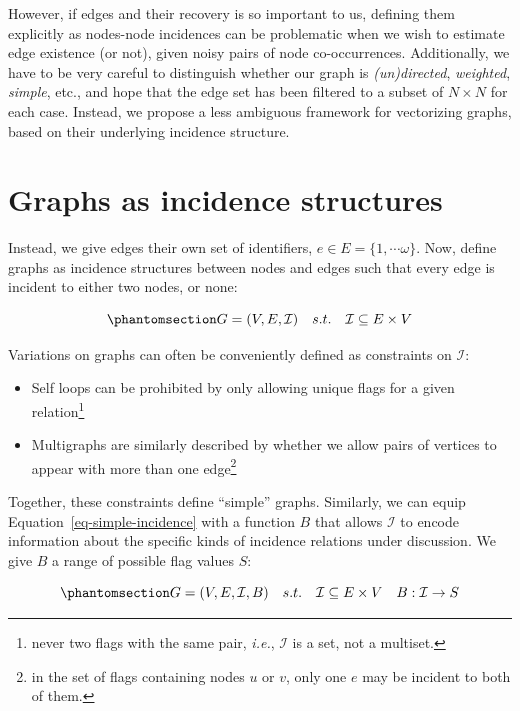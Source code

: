 \documentclass[%
	12pt,
		oneside,
		letterpaper
]{book}
\providecommand{\tightlist}{%
  \setlength{\itemsep}{0pt}\setlength{\parskip}{0pt}}\usepackage{longtable,booktabs,array}
\begin{document}
However, if edges and their recovery is so important to us, defining them explicitly as nodes-node incidences can be problematic when we wish to estimate edge existence (or not), given noisy pairs of node co-occurrences.
Additionally, we have to be very careful to distinguish whether our graph is \emph{(un)directed}, \emph{weighted}, \emph{simple}, etc., and hope that the edge set has been filtered to a subset of \(N\times N\) for each case.
Instead, we propose a less ambiguous framework for vectorizing graphs, based on their underlying incidence structure.

\section{Graphs as incidence structures}\label{sec-incidence-vec}

Instead, we give edges their own set of identifiers, \(e\in E=\{1,\cdots \omega\}\).
Now, define graphs as incidence structures between nodes and edges such that every edge is incident to either two nodes, or none:

\begin{equation}\phantomsection\label{eq-simple-incidence}{
G = (V,E,\mathcal{I}) \quad s.t. \quad \mathcal{I} \subseteq E\times V
}\end{equation}

Variations on graphs can often be conveniently defined as constraints on \(\mathcal{I}\):

\begin{itemize}
\tightlist
\item
  Self loops can be prohibited by only allowing unique flags for a given relation\footnote{
    never two flags with the same pair, \emph{i.e.}, \(\mathcal{I}\) is a set, not a multiset.}
\item
  Multigraphs are similarly described by whether we allow pairs of vertices to appear with more than one edge\footnote{
    in the set of flags containing nodes \(u\) or \(v\), only one \(e\) may be incident to both of them.}
\end{itemize}

Together, these constraints define ``simple'' graphs.
Similarly, we can equip Equation~\ref{eq-simple-incidence} with a function \(B\) that allows \(\mathcal{I}\) to encode information about the specific kinds of incidence relations under discussion.
We give \(B\) a range of possible flag values \(S\):

\begin{equation}\phantomsection\label{eq-map-incidence}{
G = (V,E,\mathcal{I},B) \quad s.t. \quad \mathcal{I} \subseteq E\times V\quad B:\mathcal{I}\rightarrow S
}\end{equation}
\end{document}
